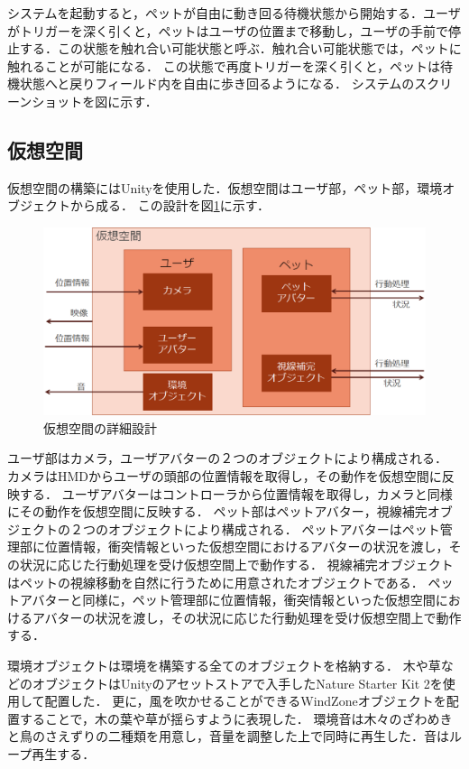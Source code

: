 システムを起動すると，ペットが自由に動き回る待機状態から開始する．ユーザがトリガーを深く引くと，ペットはユーザの位置まで移動し，ユーザの手前で停止する．この状態を触れ合い可能状態と呼ぶ．触れ合い可能状態では，ペットに触れることが可能になる．
この状態で再度トリガーを深く引くと，ペットは待機状態へと戻りフィールド内を自由に歩き回るようになる．
システムのスクリーンショットを図に示す．

\subsection{仮想空間}

仮想空間の構築にはUnityを使用した．仮想空間はユーザ部，ペット部，環境オブジェクトから成る．
この設計を図\ref{fig:design2}に示す．

\begin{figure}[H]
\centering
\includegraphics*[width=15cm,clip]{images/design2.eps}
\caption{仮想空間の詳細設計}
\label{fig:design2}
\end{figure} 

ユーザ部はカメラ，ユーザアバターの２つのオブジェクトにより構成される．
カメラはHMDからユーザの頭部の位置情報を取得し，その動作を仮想空間に反映する．
ユーザアバターはコントローラから位置情報を取得し，カメラと同様にその動作を仮想空間に反映する．
ペット部はペットアバター，視線補完オブジェクトの２つのオブジェクトにより構成される．
ペットアバターはペット管理部に位置情報，衝突情報といった仮想空間におけるアバターの状況を渡し，その状況に応じた行動処理を受け仮想空間上で動作する．
視線補完オブジェクトはペットの視線移動を自然に行うために用意されたオブジェクトである．
ペットアバターと同様に，ペット管理部に位置情報，衝突情報といった仮想空間におけるアバターの状況を渡し，その状況に応じた行動処理を受け仮想空間上で動作する．

環境オブジェクトは環境を構築する全てのオブジェクトを格納する．
木や草などのオブジェクトはUnityのアセットストアで入手したNature Starter Kit 2を使用して配置した．
更に，風を吹かせることができるWindZoneオブジェクトを配置することで，木の葉や草が揺らすように表現した．
環境音は木々のざわめきと鳥のさえずりの二種類を用意し，音量を調整した上で同時に再生した．音はループ再生する．

